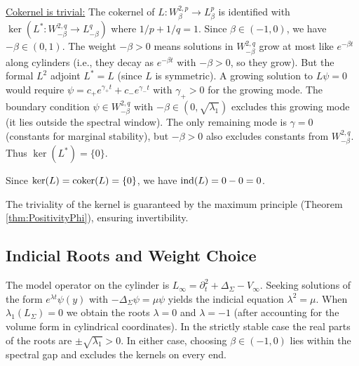 \underline{Cokernel is trivial:} The cokernel of $L: W^{2,p}_\beta \to L^p_\beta$ is identified with $\ker(L^*: W^{2,q}_{-\beta} \to L^q_{-\beta})$ where $1/p + 1/q = 1$. Since $\beta \in (-1,0)$, we have $-\beta \in (0,1)$. The weight $-\beta > 0$ means solutions in $W^{2,q}_{-\beta}$ grow at most like $e^{-\beta t}$ along cylinders (i.e., they decay as $e^{-\beta t}$ with $-\beta > 0$, so they grow). But the formal $L^2$ adjoint $L^* = L$ (since $L$ is symmetric). A growing solution to $L\psi = 0$ would require $\psi = c_+ e^{\gamma_+ t} + c_- e^{\gamma_- t}$ with $\gamma_+ > 0$ for the growing mode. The boundary condition $\psi \in W^{2,q}_{-\beta}$ with $-\beta \in (0, \sqrt{\lambda_1})$ excludes this growing mode (it lies outside the spectral window). The only remaining mode is $\gamma = 0$ (constants for marginal stability), but $-\beta > 0$ also excludes constants from $W^{2,q}_{-\beta}$. Thus $\ker(L^*) = \{0\}$.

Since $\ker(L) = \mathrm{coker}(L) = \{0\}$, we have $\mathrm{ind}(L) = 0 - 0 = 0$.

The triviality of the kernel is guaranteed by the maximum principle (Theorem \ref{thm:PositivityPhi}), ensuring invertibility.

\subsection{Indicial Roots and Weight Choice}

The model operator on the cylinder is $L_\infty = \partial_t^2 + \Delta_\Sigma - V_\infty$.  Seeking solutions of the form $e^{\lambda t}\psi(y)$ with $-\Delta_\Sigma \psi = \mu \psi$ yields the indicial equation $\lambda^2 = \mu$.  When $\lambda_1(L_\Sigma)=0$ we obtain the roots $\lambda=0$ and $\lambda=-1$ (after accounting for the volume form in cylindrical coordinates).  In the strictly stable case the real parts of the roots are $\pm \sqrt{\lambda_1}>0$.  In either case, choosing $\beta \in (-1,0)$ lies within the spectral gap and excludes the kernels on every end.

